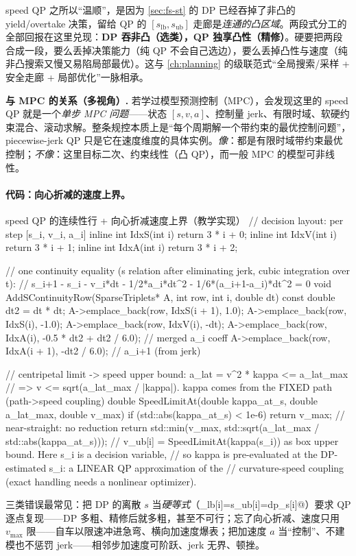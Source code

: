 \begin{insight}
speed QP 之所以“温顺”，是因为 \cref{sec:fs-st} 的 DP 已经吞掉了非凸的 yield/overtake 决策，留给 QP 的 $[s_{\mathrm{lb}},s_{\mathrm{ub}}]$ 走廊是\emph{连通的凸区域}。两段式分工的全部回报在这里兑现：\textbf{DP 吞非凸（选类），QP 独享凸性（精修）}。硬要把两段合成一段，要么丢掉决策能力（纯 QP 不会自己选边），要么丢掉凸性与速度（纯非凸搜索又慢又易陷局部最优）。这与 \cref{ch:planning} 的级联范式“全局搜索/采样 + 安全走廊 + 局部优化”一脉相承。
\end{insight}

\begin{note}
\textbf{与 MPC 的关系（多视角）.}\;
若学过模型预测控制（MPC），会发现这里的 speed QP 就是一个\emph{单步 MPC 问题}——状态 $[s,v,a]$、控制量 jerk、有限时域、软硬约束混合、滚动求解。整条规控本质上是“每个周期解一个带约束的最优控制问题”，piecewise-jerk QP 只是它在速度维度的具体实例。\emph{像}：都是有限时域带约束最优控制；\emph{不像}：这里目标二次、约束线性（凸 QP），而一般 MPC 的模型可非线性。
\end{note}

\paragraph{代码：向心折减的速度上界。}
\begin{codebox}[C++]{speed QP 的连续性行 + 向心折减速度上界（教学实现）}
// decision layout: per step [s_i, v_i, a_i]
inline int IdxS(int i){ return 3 * i + 0; }
inline int IdxV(int i){ return 3 * i + 1; }
inline int IdxA(int i){ return 3 * i + 2; }

// one continuity equality (s relation after eliminating jerk, cubic integration over t):
//   s_{i+1} - s_i - v_i*dt - 1/2*a_i*dt^2 - 1/6*(a_{i+1}-a_i)*dt^2 = 0
void AddSContinuityRow(SparseTriplets* A, int row, int i, double dt){
  const double dt2 = dt * dt;
  A->emplace_back(row, IdxS(i + 1),  1.0);
  A->emplace_back(row, IdxS(i),     -1.0);
  A->emplace_back(row, IdxV(i),     -dt);
  A->emplace_back(row, IdxA(i),     -0.5 * dt2 + dt2 / 6.0);   // merged a_i coeff
  A->emplace_back(row, IdxA(i + 1), -dt2 / 6.0);               // a_{i+1} (from jerk)
}

// centripetal limit -> speed upper bound: a_lat = v^2 * kappa <= a_lat_max
//   => v <= sqrt(a_lat_max / |kappa|).  kappa comes from the FIXED path (path->speed coupling)
double SpeedLimitAt(double kappa_at_s, double a_lat_max, double v_max){
  if (std::abs(kappa_at_s) < 1e-6) return v_max;              // near-straight: no reduction
  return std::min(v_max, std::sqrt(a_lat_max / std::abs(kappa_at_s)));
}
// v_ub[i] = SpeedLimitAt(kappa(s_i)) as box upper bound. Here s_i is a decision variable,
// so kappa is pre-evaluated at the DP-estimated s_i: a LINEAR QP approximation of the
// curvature-speed coupling (exact handling needs a nonlinear optimizer).
\end{codebox}
三类错误最常见：把 DP 的离散 $s$ 当\emph{硬等式}（\verb@s_lb[i]=s_ub[i]=dp_s[i]@）要求 QP 逐点复现——DP 多粗、精修后就多粗，甚至不可行；忘了向心折减、速度只用 $v_{\max}$ 限——自车以限速冲进急弯、横向加速度爆表；把加速度 $a$ 当“控制”、不建模也不惩罚 jerk——相邻步加速度可阶跃、jerk 无界、顿挫。

